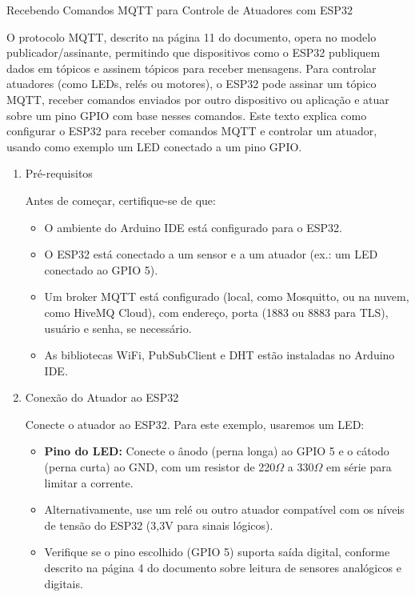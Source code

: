 \documentclass[a4paper]{article}
\begin{document}
    \begin{answer}
        Recebendo Comandos MQTT para Controle de Atuadores com ESP32

        O protocolo MQTT, descrito na página 11 do documento, opera no modelo publicador/assinante, permitindo que dispositivos como o ESP32 publiquem dados em tópicos e assinem tópicos para receber mensagens. Para controlar atuadores (como LEDs, relés ou motores), o ESP32 pode assinar um tópico MQTT, receber comandos enviados por outro dispositivo ou aplicação e atuar sobre um pino GPIO com base nesses comandos. Este texto explica como configurar o ESP32 para receber comandos MQTT e controlar um atuador, usando como exemplo um LED conectado a um pino GPIO.

        \begin{enumerate}

            \item {Pré-requisitos}

            Antes de começar, certifique-se de que:
            \begin{itemize}
                \item O ambiente do Arduino IDE está configurado para o ESP32.
                \item O ESP32 está conectado a um sensor e a um atuador (ex.: um LED conectado ao GPIO 5).
                \item Um broker MQTT está configurado (local, como Mosquitto, ou na nuvem, como HiveMQ Cloud), com endereço, porta (1883 ou 8883 para TLS), usuário e senha, se necessário.
                \item As bibliotecas WiFi, PubSubClient e DHT estão instaladas no Arduino IDE.
            \end{itemize}

            \item{Conexão do Atuador ao ESP32}

            Conecte o atuador ao ESP32. Para este exemplo, usaremos um LED:
            \begin{itemize}
                \item \textbf{Pino do LED:} Conecte o ânodo (perna longa) ao GPIO 5 e o cátodo (perna curta) ao GND, com um resistor de 220$\Omega$ a 330$\Omega$ em série para limitar a corrente.
                \item Alternativamente, use um relé ou outro atuador compatível com os níveis de tensão do ESP32 (3,3V para sinais lógicos).
                \item Verifique se o pino escolhido (GPIO 5) suporta saída digital, conforme descrito na página 4 do documento sobre leitura de sensores analógicos e digitais.
            \end{itemize}


\end{enumerate}
\end{answer}
\end{document}
